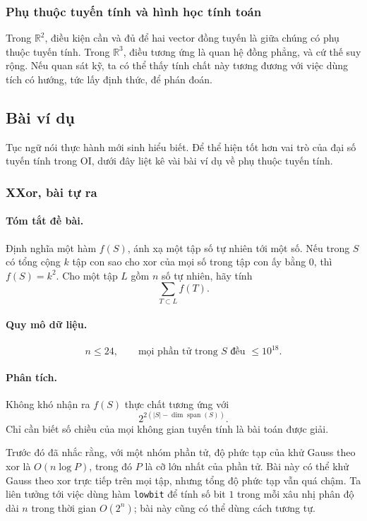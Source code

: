 \documentclass[11pt]{article}
\begin{document}
\subsubsection{Phụ thuộc tuyến tính và hình học tính toán}

Trong \(\mathbb{R}^2\), điều kiện cần và đủ để hai vector đồng tuyến là giữa
chúng có phụ thuộc tuyến tính. Trong \(\mathbb{R}^3\), điều tương ứng là quan hệ
đồng phẳng, và cứ thế suy rộng. Nếu quan sát kỹ, ta có thể thấy tính chất này
tương đương với việc dùng tích có hướng, tức lấy định thức, để phán đoán.

\subsection{Bài ví dụ}

Tục ngữ nói thực hành mới sinh hiểu biết. Để thể hiện tốt hơn vai trò của đại
số tuyến tính trong OI, dưới đây liệt kê vài bài ví dụ về phụ thuộc tuyến tính.

\subsubsection{XXor, bài tự ra}

\paragraph{Tóm tắt đề bài.}
Định nghĩa một hàm \(f(S)\), ánh xạ một tập số tự nhiên tới một số. Nếu trong
\(S\) có tổng cộng \(k\) tập con sao cho xor của mọi số trong tập con ấy bằng
\(0\), thì \(f(S)=k^2\). Cho một tập \(L\) gồm \(n\) số tự nhiên, hãy tính
\[
  \sum_{T\subset L} f(T).
\]

\paragraph{Quy mô dữ liệu.}
\[
  n\le24,\qquad \text{mọi phần tử trong }S\text{ đều }\le10^{18}.
\]

\paragraph{Phân tích.}
Không khó nhận ra \(f(S)\) thực chất tương ứng với
\[
  2^{2(|S|-\dim\operatorname{span}(S))}.
\]
Chỉ cần biết số chiều của mọi không gian tuyến tính là bài toán được giải.

Trước đó đã nhắc rằng, với một nhóm phần tử, độ phức tạp của khử Gauss theo xor
là \(O(n\log P)\), trong đó \(P\) là cỡ lớn nhất của phần tử. Bài này có thể khử
Gauss theo xor trực tiếp trên mọi tập, nhưng tổng độ phức tạp vẫn quá chậm. Ta
liên tưởng tới việc
dùng hàm \texttt{lowbit} để tính số bit \(1\) trong mỗi xâu nhị phân độ dài
\(n\) trong thời gian \(O(2^n)\); bài này cũng có thể dùng cách tương tự.
\end{document}
